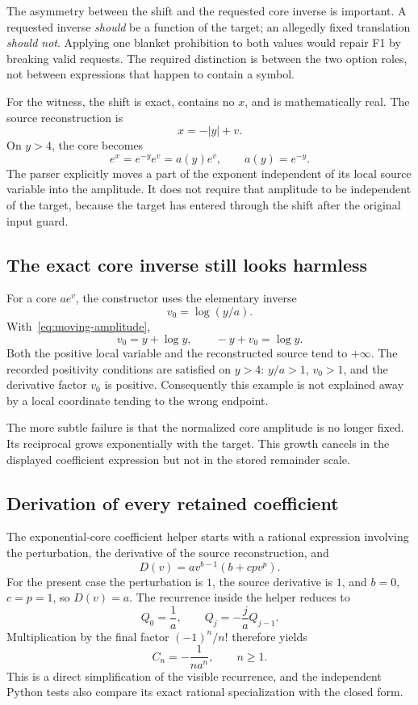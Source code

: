 \documentclass[11pt,letterpaper]{article}
\begin{document}
The asymmetry between the shift and the requested core inverse is important. A requested inverse \emph{should} be a function of the target; an allegedly fixed translation \emph{should not}. Applying one blanket prohibition to both values would repair F1 by breaking valid requests. The required distinction is between the two option roles, not between expressions that happen to contain a symbol.

For the witness, the shift is exact, contains no $x$, and is mathematically real. The source reconstruction is
\[
 x=-|y|+v.
\]
On $y>4$, the core becomes
\begin{equation}
 e^x=e^{-y}e^v=a(y)e^v,\qquad a(y)=e^{-y}.
 \label{eq:moving-amplitude}
\end{equation}
The parser explicitly moves a part of the exponent independent of its local source variable into the amplitude. It does not require that amplitude to be independent of the target, because the target has entered through the shift after the original input guard.\cite{lambert}

\subsection{The exact core inverse still looks harmless}
For a core $a e^v$, the constructor uses the elementary inverse
\[
 v_0=\log(y/a).
\]
With~\eqref{eq:moving-amplitude},
\begin{equation}
 v_0=y+\log y,\qquad -y+v_0=\log y.
 \label{eq:v0}
\end{equation}
Both the positive local variable and the reconstructed source tend to $+\infty$. The recorded positivity conditions are satisfied on $y>4$: $y/a>1$, $v_0>1$, and the derivative factor $v_0$ is positive. Consequently this example is not explained away by a local coordinate tending to the wrong endpoint.

The more subtle failure is that the normalized core amplitude is no longer fixed. Its reciprocal grows exponentially with the target. This growth cancels in the displayed coefficient expression but not in the stored remainder scale.

\subsection{Derivation of every retained coefficient}
The exponential-core coefficient helper starts with a rational expression involving the perturbation, the derivative of the source reconstruction, and
\[
 D(v)=a v^{b-1}(b+cpv^p).
\]
For the present case the perturbation is $1$, the source derivative is $1$, and $b=0$, $c=p=1$, so $D(v)=a$. The recurrence inside the helper reduces to
\[
 Q_0=\frac1a,\qquad Q_j=-\frac{j}{a}Q_{j-1}.
\]
Multiplication by the final factor $(-1)^n/n!$ therefore yields
\begin{equation}
 C_n=-\frac{1}{n a^n},\qquad n\ge1.
 \label{eq:coeffs}
\end{equation}
This is a direct simplification of the visible recurrence, and the independent Python tests also compare its exact rational specialization with the closed form.\cite{exp-core}
\end{document}
